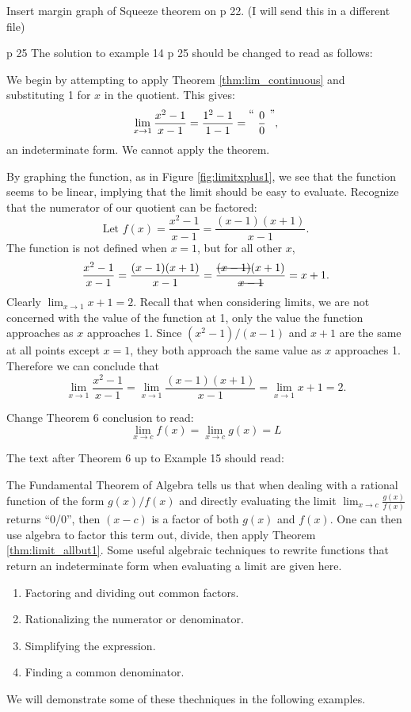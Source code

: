 \documentclass[10pt]{article}
\newcommand{\ds}{\displaystyle}
\begin{document}
Insert margin graph of Squeeze theorem on p 22. (I will send this in a different file)

p 25 The solution to example 14 p 25 should be changed to read as follows: 


{We begin by attempting to apply Theorem \ref{thm:lim_continuous} and substituting 1 for $x$ in the quotient. This gives:
		$$\lim_{x\to 1}\frac{x^2-1}{x-1} = \frac{1^2-1}{1-1} = \raisebox{8pt}{\text{``\ }}\frac{0}{0}\raisebox{8pt}{\text{\ ''}},$$ an indeterminate form. We cannot apply the theorem.


		
		By graphing the function, as in Figure \ref{fig:limitxplus1}, we see that the function seems to be linear, implying that the limit should be easy to evaluate. Recognize that the numerator of our quotient can be factored:
		$$\text{Let \ } f(x)=\frac{x^2-1}{x-1} = \frac{(x-1)(x+1)}{x-1}.$$
		The function is not defined when $x=1$, but for all other $x$, $$\frac{x^2-1}{x-1} = \frac{(x-1)(x+1)}{x-1} = \frac{\hbox{\sout{$(x-1)$}}(x+1)}{\hbox{\sout{$x-1$}}}= x+1.$$
		Clearly $\ds \lim_{x\to 1}x+1 = 2$. Recall that when considering limits, we are not concerned with the value of the function at 1, only the value the function approaches as $x$ approaches 1. Since $(x^2-1)/(x-1)$ and $x+1$ are the same at all points except $x=1$, they both approach the same value as $x$ approaches 1. Therefore we can conclude that $$\lim_{x\to 1}\frac{x^2-1}{x-1}=\lim_{x\to 1}\frac{(x-1)(x+1)}{x-1}=\lim_{x\to 1} x+1=2.$$


Change Theorem 6 conclusion to read:  $$\lim_{x\to c} f(x)=\lim_{x\to c} g(x)=L$$

The text after Theorem 6 up to Example 15 should read:  

The Fundamental Theorem of Algebra tells us that when dealing with a rational function of the form $g(x)/f(x)$ and directly evaluating the limit $\ds \lim_{x\to c} \frac{g(x)}{f(x)}$ returns ``0/0'', 
then $(x-c)$ is a factor of both $g(x)$ and $f(x)$. One can then use algebra to factor this term out, divide, then apply Theorem \ref{thm:limit_allbut1}. Some useful algebraic techniques to rewrite functions that return an indeterminate form when evaluating a limit are given here.  
\begin{enumerate}
\item Factoring and dividing out common factors.
\item Rationalizing the numerator or denominator.
\item Simplifying the expression.
\item Finding a common denominator.
\end{enumerate}
We will demonstrate some of these thechniques in the following examples.\\

}
\end{document}
